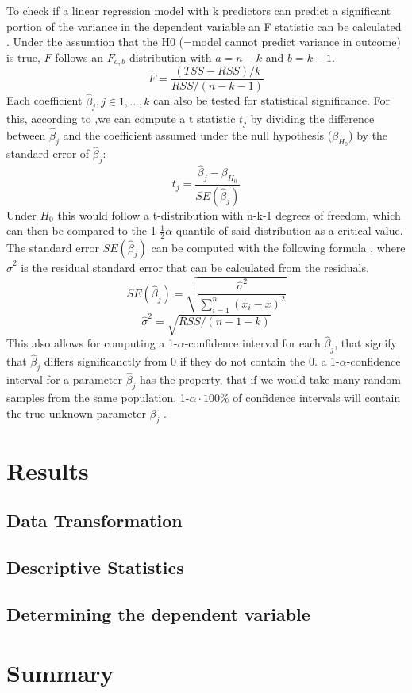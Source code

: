 \documentclass[12 pt]{scrartcl}
\begin{document}
To check if a linear regression model with k predictors can predict a significant portion of the variance in the dependent variable an F statistic can be calculated \citep[p.~76]{james2013introduction}. Under the assumtion that the H0 (=model cannot predict variance in outcome) is true, $F$ follows an $F_{a,b}$ distribution with $a = n-k$ and $b = k-1$.
\[F = \frac{(TSS-RSS)/k}{RSS/(n-k-1)}\]
Each coefficient $\hat{\beta}_j, j \in {1,...,k}$ can also be tested for statistical significance. For this, according to \citet[p.~67]{james2013introduction},we can compute a t statistic $t_j$ by dividing the difference between $\hat{\beta}_j$ and the coefficient assumed under the null hypothesis ($\beta_{H_0}$) by the standard error of $\hat{\beta}_j$:
\[ t_j = \frac{\hat{\beta}_j - \beta_{H_0}}{SE(\hat{\beta}_j)} \]
Under $H_0$ this would follow a t-distribution with n-k-1 degrees of freedom, which can then be compared to the 1-$\frac{1}{2}\alpha$-quantile of said distribution as a critical value.
The standard error $SE(\hat{\beta}_j)$ can be computed with the following formula \citep[p.~66]{james2013introduction}, where $\hat{\sigma}^2$ is the residual standard error that can be calculated from the residuals.
\[SE(\hat{\beta}_j) = \sqrt{\frac{\hat{\sigma}^2}{\sum_{i=1}^n{(x_i-\overline{x})^2}}}\]
\[ \hat{\sigma}^2 = \sqrt{RSS/(n-1-k)}  \]
This also allows for computing a 1-$\alpha$-confidence interval for each $\hat{\beta}_j$, that signify that $\hat{\beta}_j$ differs significanctly from 0 if they do not contain the 0. a 1-$\alpha$-confidence interval for a parameter $\hat{\beta}_j$ has the property, that if we would take many random samples from the same population, 1-$\alpha\cdot100\%$ of confidence intervals will contain the true unknown parameter $\beta_j$ \citep[p.~66]{james2013introduction}.

\section{Results}

\subsection{Data Transformation}

\subsection{Descriptive Statistics}

\subsection{Determining the dependent variable}


\section{Summary}


\newpage
{}
\renewcommand\refname{Bibliography}


\end{document}
